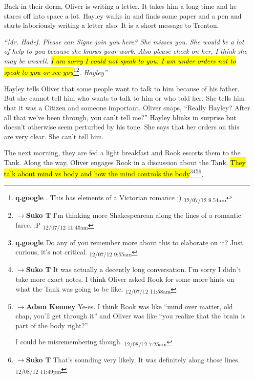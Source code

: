 Back in their dorm, Oliver is writing a letter.  It takes him a long time and he stares off into space a lot.  Hayley walks in and finds some paper and a pen and starts laboriously writing a letter also.  It is a short message to Trenton.



\textit{``Mr. Hadef.  Please can Signe join you here?  She misses you. She would be a lot of help to you because she knows your work.  Also please check on her, I think she may be unwell.  }\textit{\hl{I am sorry I could not speak to you.  I am under orders not to speak to you or see you}}\footnote{\textbf{q.google }.  This has elements of a Victorian romance ;) \textsubscript{12/07/12 9:54am}}\footnote{$\rightarrow$\textbf{Suko T }I'm thinking more Shakespearean along the lines of a romantic farce. ;P \textsubscript{12/07/12 11:45am}}\textit{. Hayley''}



Hayley tells Oliver that some people want to talk to him because of his father.  But she cannot tell him who wants to talk to him or who told her.  She tells him that it was a Citizen and someone important.  Oliver snaps, ``Really Hayley?  After all that we've been through, you can't tell me?''  Hayley blinks in surprise but doesn't otherwise seem perturbed by his tone.  She  says that her orders on this are very clear.  She can't tell him.



The next morning, they are fed a light breakfast and Rook escorts them to the Tank.  Along the way, Oliver engages Rook in a discussion about the Tank.  \hl{They talk about mind vs body and how the mind controls the body}\footnote{\textbf{q.google }Do any of you remember more about this to elaborate on it?  Just curious, it's not critical. \textsubscript{12/07/12 9:55am}}\footnote{$\rightarrow$\textbf{Suko T }It was actually a decently long conversation.  I'm sorry I didn't take more exact notes.  I think Oliver asked Rook for some more hints on what the Tank was going to be like. \textsubscript{12/07/12 11:58am}}\footnote{$\rightarrow$\textbf{Adam Kenney }Ye-es.  I think Rook was like ``mind over matter, old chap, you'll get through it'' and Oliver was like ``you realize that the brain is part of the body right?''  

I could be misremembering though. \textsubscript{12/08/12 7:25am}}\footnote{$\rightarrow$\textbf{Suko T }That's sounding very likely.  It was definitely along those lines. \textsubscript{12/08/12 11:49pm}}. 



